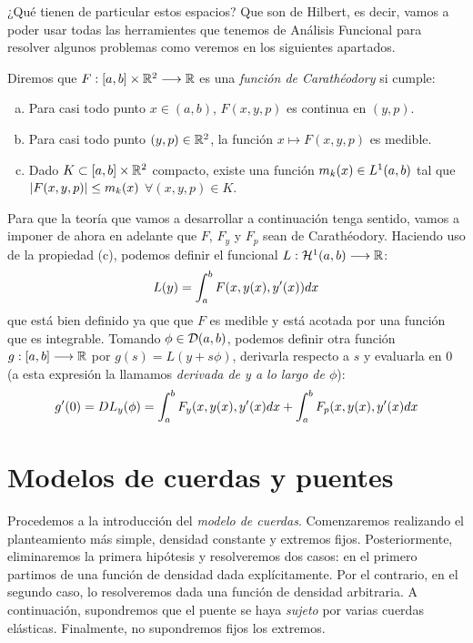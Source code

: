 ¿Qué tienen de particular estos espacios? Que son de Hilbert, es decir, vamos a poder usar todas las herramientes que tenemos de Análisis Funcional para resolver algunos problemas como veremos en los siguientes apartados.

\begin{definition}
Diremos que $F : [a,b]\times\mathbb{R}^2 \longrightarrow \mathbb{R}$ es una \textit{función de Carathéodory} si cumple:
\begin{enumerate}[(a)]
\item Para casi todo punto $x\in(a,b)$, $F(x,y,p)$ es continua en $(y,p)$.
\item Para casi todo punto $(y,p)\in\mathbb{R}^2$, la función $x\mapsto F(x,y,p)$ es medible.
\item Dado $K\subset[a,b]\times\mathbb{R}^2$ compacto, existe una función $m_k(x)\in L^{ 1 }(a,b)$ tal que $\left| F(x,y,p) \right|\leq m_k(x)$ $\forall(x,y,p)\in K$.
\end{enumerate}
\end{definition}

Para que la teoría que vamos a desarrollar a continuación tenga sentido, vamos a imponer de ahora en adelante que $F$, $F_y$ y $F_p$ sean de Carathéodory. Haciendo uso de la propiedad (c), podemos definir el funcional $L : \mathcal{H}^{ 1 } (a,b) \longrightarrow \mathbb{R}$:
\[
L(y)=\displaystyle\int_{ a }^{ b } F(x,y(x),y'(x))dx
\]
que está bien definido ya que que $F$ es medible y está acotada por una función que es integrable. Tomando $\phi\in\mathcal{D}(a,b)$, podemos definir otra función $g : [a,b] \longrightarrow \mathbb{R}$ por $g(s)=L(y+s\phi)$, derivarla respecto a $s$ y evaluarla en 0 (a esta expresión la llamamos \textit{derivada de y a lo largo de $\phi$}):
\[
g'(0)=DL_y(\phi)=\displaystyle\int_{ a }^{ b } F_y(x,y(x),y'(x)dx+\displaystyle\int_{ a }^{ b } F_p(x,y(x),y'(x)dx
\]
\newpage

\section{Modelos de cuerdas y puentes}

Procedemos a la introducción del \textit{modelo de cuerdas}. Comenzaremos realizando el planteamiento más simple, densidad constante y extremos fijos. Posteriormente, eliminaremos la primera hipótesis y resolveremos dos casos: en el primero partimos de una función de densidad dada explícitamente. Por el contrario, en el segundo caso, lo resolveremos dada una función de densidad arbitraria. A continuación, supondremos que el puente se haya \textit{sujeto} por varias cuerdas elásticas. Finalmente, no supondremos fijos los extremos.

